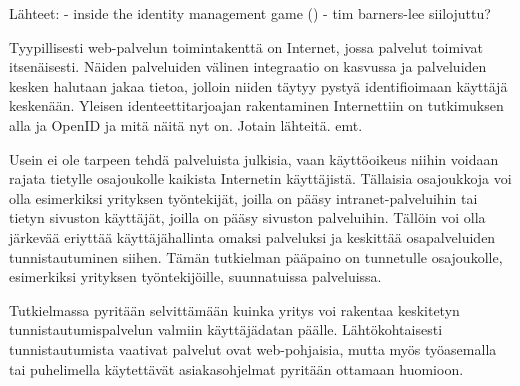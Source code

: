 Lähteet:
- inside the identity management game (\cite{inside_the_identity_management_game})
- tim barners-lee siilojuttu?

Tyypillisesti web-palvelun toimintakenttä on Internet, jossa palvelut toimivat itsenäisesti. Näiden palveluiden välinen integraatio on kasvussa ja palveluiden kesken halutaan jakaa tietoa, jolloin niiden täytyy pystyä identifioimaan käyttäjä keskenään. Yleisen identeettitarjoajan rakentaminen Internettiin on tutkimuksen alla ja OpenID ja mitä näitä nyt on. Jotain lähteitä. emt.

Usein ei ole tarpeen tehdä palveluista julkisia, vaan käyttöoikeus niihin voidaan rajata tietylle osajoukolle kaikista Internetin käyttäjistä. Tällaisia osajoukkoja voi olla esimerkiksi yrityksen työntekijät, joilla on pääsy intranet-palveluihin tai tietyn sivuston käyttäjät, joilla on pääsy sivuston palveluihin. Tällöin voi olla järkevää eriyttää käyttäjähallinta omaksi palveluksi ja keskittää osapalveluiden tunnistautuminen siihen. Tämän tutkielman pääpaino on tunnetulle osajoukolle, esimerkiksi yrityksen työntekijöille, suunnatuissa palveluissa.

Tutkielmassa pyritään selvittämään kuinka yritys voi rakentaa keskitetyn tunnistautumispalvelun valmiin käyttäjädatan päälle. Lähtökohtaisesti tunnistautumista vaativat palvelut ovat web-pohjaisia, mutta myös työasemalla tai puhelimella käytettävät asiakasohjelmat pyritään ottamaan huomioon.